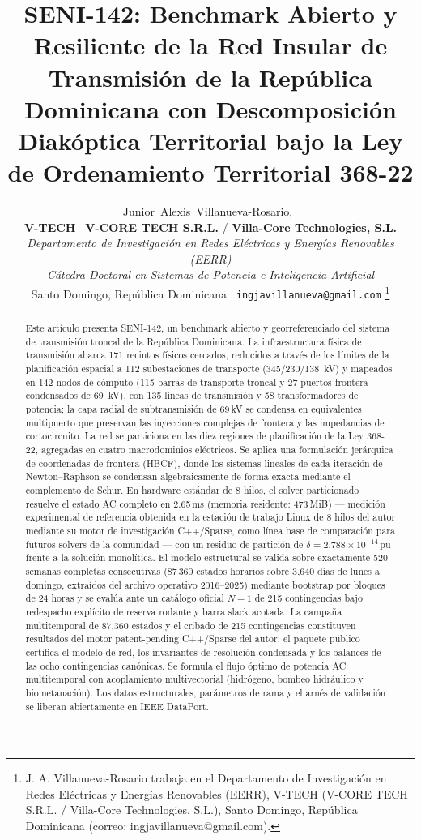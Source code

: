 \documentclass[11pt, journal, onecolumn]{IEEEtran}
\title{SENI-142: Benchmark Abierto y Resiliente de la Red Insular de Transmisión de la República Dominicana con Descomposición Diakóptica Territorial bajo la Ley de Ordenamiento Territorial 368-22}
\author{Junior~Alexis~Villanueva-Rosario,~\IEEEmembership{Ms.C., Ph.D.(c)}\\[0.3em]
{\normalsize\textnormal{\textbf{V-TECH} \textbar\ \textbf{V-CORE TECH S.R.L.} / \textbf{Villa-Core Technologies, S.L.}}}\\[0.15em]
{\footnotesize\textnormal{\textit{Departamento de Investigación en Redes Eléctricas y Energías Renovables (EERR)}}}\\[0.15em]
{\footnotesize\textnormal{\textit{Cátedra Doctoral en Sistemas de Potencia e Inteligencia Artificial}}}\\[0.15em]
{\footnotesize\textnormal{Santo Domingo, República Dominicana \textbar\ \texttt{ingjavillanueva@gmail.com}}}%
\thanks{J. A. Villanueva-Rosario trabaja en el Departamento de Investigación en Redes Eléctricas y Energías Renovables (EERR), V-TECH (V-CORE TECH S.R.L. / Villa-Core Technologies, S.L.), Santo Domingo, República Dominicana (correo: ingjavillanueva@gmail.com).}}
\begin{document}
\maketitle

\begin{abstract}
Este artículo presenta SENI-142, un benchmark abierto y georreferenciado del sistema de transmisión troncal de la República Dominicana. La infraestructura física de transmisión abarca 171 recintos físicos cercados, reducidos a través de los límites de la planificación espacial a 112 subestaciones de transporte (345/230/138~kV) y mapeados en 142 nodos de cómputo (115 barras de transporte troncal y 27 puertos frontera condensados de 69~kV), con 135 líneas de transmisión y 58 transformadores de potencia; la capa radial de subtransmisión de 69\,kV se condensa en equivalentes multipuerto que preservan las inyecciones complejas de frontera y las impedancias de cortocircuito. La red se particiona en las diez regiones de planificación de la Ley 368-22, agregadas en cuatro macrodominios eléctricos. Se aplica una formulación jerárquica de coordenadas de frontera (HBCF), donde los sistemas lineales de cada iteración de Newton--Raphson se condensan algebraicamente de forma exacta mediante el complemento de Schur. En hardware estándar de 8 hilos, el solver particionado resuelve el estado AC completo en 2.65\,ms (memoria residente: 473\,MiB) --- medición experimental de referencia obtenida en la estación de trabajo Linux de 8 hilos del autor mediante su motor de investigación C++/Sparse, como línea base de comparación para futuros solvers de la comunidad --- con un residuo de partición de $\delta = 2.788 \times 10^{-14}$\,pu frente a la solución monolítica. El modelo estructural se valida sobre exactamente 520 semanas completas consecutivas (87\,360 estados horarios sobre 3,640 días de lunes a domingo, extraídos del archivo operativo 2016--2025) mediante bootstrap por bloques de 24 horas y se evalúa ante un catálogo oficial $N-1$ de 215 contingencias bajo redespacho explícito de reserva rodante y barra slack acotada. La campaña multitemporal de 87,360 estados y el cribado de 215 contingencias constituyen resultados del motor patent-pending C++/Sparse del autor; el paquete público certifica el modelo de red, los invariantes de resolución condensada y los balances de las ocho contingencias canónicas. Se formula el flujo óptimo de potencia AC multitemporal con acoplamiento multivectorial (hidrógeno, bombeo hidráulico y biometanación). Los datos estructurales, parámetros de rama y el arnés de validación se liberan abiertamente en IEEE DataPort.
\end{abstract}
\end{document}
